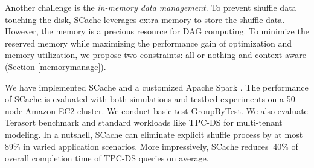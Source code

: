 Another challenge is the \textit{in-memory data management}. 
To prevent shuffle data touching the disk, SCache leverages extra memory to store the shuffle data. 
However, the memory is a precious resource for DAG computing. 
To minimize the reserved memory while maximizing the performance gain of optimization and memory utilization, we propose two constraints: all-or-nothing and context-aware (Section \ref{memorymanage}).

We have implemented SCache and a customized Apache Spark \cite{apachespark}. 
The performance of SCache is evaluated with both simulations and testbed experiments on a 50-node Amazon EC2 cluster. 
We conduct basic test GroupByTest. 
We also evaluate Terasort \cite{spark-tera} benchmark and standard workloads like TPC-DS \cite{tpcds} for multi-tenant modeling. 
In a nutshell, SCache can eliminate explicit shuffle process by at most $89\%$ in varied application scenarios. 
More impressively, SCache reduces $~40\%$ of overall completion time of TPC-DS queries on average.

